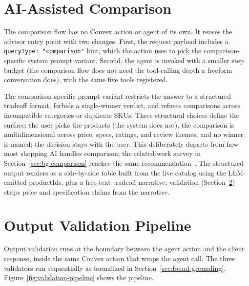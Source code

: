 \section{AI-Assisted Comparison}
\label{sec:sys-comparison}

The comparison flow has no Convex action or agent of its own. It
reuses the advisor entry point with two changes. First, the
request payload includes a \texttt{queryType: "comparison"}
hint, which the action uses to pick the comparison-specific
system prompt variant. Second, the agent is invoked with a
smaller step budget (the comparison flow does not need the
tool-calling depth a freeform conversation does), with the same
five tools registered.

The comparison-specific prompt variant restricts the answer to a
structured tradeoff format, forbids a single-winner verdict, and
refuses comparisons across incompatible categories or duplicate
SKUs. Three structural choices define the surface: the user
picks the products (the system does not), the comparison is
multidimensional across price, specs, ratings, and review
themes, and no winner is named; the decision stays with the
user. This deliberately departs from how most shopping AI handles
comparison; the related-work survey in
Section~\ref{sec:bg-comparison} reaches the same
recommendation~\cite{ShopifyAgentic,SmashingAgenticUX}. The
structured output renders as a side-by-side table built from the
live catalog using the LLM-emitted productIds, plus a free-text
tradeoff narrative; validation (Section~\ref{sec:sys-validation})
strips price and specification claims from the narrative.

\section{Output Validation Pipeline}
\label{sec:sys-validation}

Output validation runs at the boundary between the agent action
and the client response, inside the same Convex action that
wraps the agent call. The three validators run
sequentially as formalized in
Section~\ref{sec:found-grounding}. Figure~\ref{fig:validation-pipeline}
shows the pipeline.

